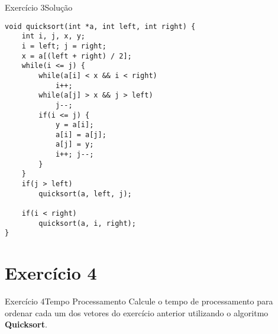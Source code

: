 \documentclass[aspectratio=169]{beamer}
\begin{document}
\begin{frame}[fragile]{Exercício 3}{Solução}
\begin{lstlisting}[style=CStyle,basicstyle=\tiny]
void quicksort(int *a, int left, int right) {
    int i, j, x, y;
    i = left; j = right;
    x = a[(left + right) / 2];
    while(i <= j) {
        while(a[i] < x && i < right)
            i++;
        while(a[j] > x && j > left) 
            j--;
        if(i <= j) {
            y = a[i];
            a[i] = a[j];
            a[j] = y;
            i++; j--;
        }
    }
    if(j > left) 
        quicksort(a, left, j);

    if(i < right) 
        quicksort(a, i, right);
}
\end{lstlisting}  
\end{frame}

\section{Exercício 4}

\begin{frame}[fragile]{Exercício 4}{Tempo Processamento}
Calcule o tempo de processamento para ordenar cada um dos vetores do exercício anterior utilizando o algoritmo {\bf Quicksort}. 
\end{frame}
%


\begin{frame}[plain]
  \titlepage
\end{frame}
\end{document}
